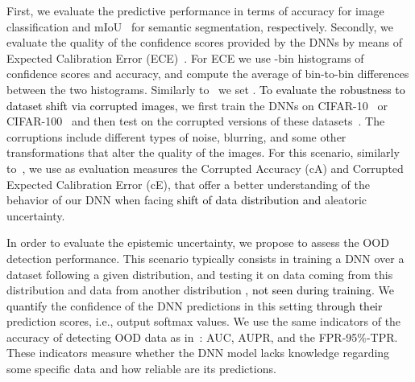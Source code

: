 \documentclass[10pt,twocolumn,letterpaper]{article}
\newcommand{\ab}[1]{\textcolor{black}{#1}}
\begin{document}
First, we evaluate the predictive performance in terms of accuracy for image classification and mIoU~\cite{everingham2015pascal} for semantic segmentation, respectively.
Secondly, we evaluate the quality of the confidence scores provided by the DNNs by means of Expected Calibration Error (ECE)~\cite{guo2017calibration}. For ECE we use -bin histograms of confidence scores and accuracy, and compute the average of  bin-to-bin differences between the two histograms. Similarly to~\cite{guo2017calibration} we set . 
\ab{To evaluate the robustness to dataset shift via corrupted images, }
we first train the DNNs on CIFAR-10~\cite{krizhevsky2009learning} or CIFAR-100~\cite{krizhevsky2009learning} and then test on the corrupted versions of these datasets~\cite{hendrycks2018benchmarking}. The corruptions include different types of noise, 
blurring, and some other transformations that alter the quality of the images. 
For this scenario, similarly to~\cite{wen2020improving}, we use as evaluation measures the Corrupted Accuracy (cA) and Corrupted Expected Calibration Error (cE), {that offer} a better understanding of the behavior of our DNN when facing \ab{shift of data distribution and} aleatoric uncertainty. 


In order to evaluate the epistemic uncertainty, we propose to assess the {OOD} {detection} performance. This scenario typically consists in training a DNN over a dataset following a given distribution, and testing it on data coming from this distribution and data from another distribution \ab{, not seen during training}. We 
\ab{quantify} the confidence of the DNN predictions in this setting 
\ab{through their} prediction scores, i.e., output softmax values. We use the same indicators of the accuracy of detecting OOD data as in~\cite{hendrycks2016baseline}: AUC, AUPR, and the FPR-95\%-TPR.
{These indicators measure 
whether the DNN model lacks knowledge regarding some specific data and how reliable are its predictions.} 
\end{document}
